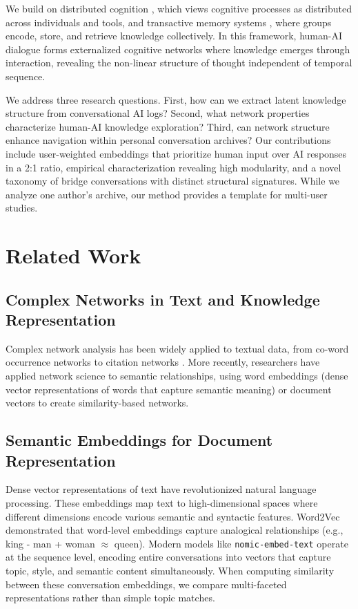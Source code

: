 \documentclass{svproc}
\begin{document}
We build on distributed cognition \cite{hutchins1995}, which views cognitive processes as distributed across individuals and tools, and transactive memory systems \cite{wegner1987}, where groups encode, store, and retrieve knowledge collectively. In this framework, human-AI dialogue forms externalized cognitive networks where knowledge emerges through interaction, revealing the non-linear structure of thought independent of temporal sequence.

We address three research questions. First, how can we extract latent knowledge structure from conversational AI logs? Second, what network properties characterize human-AI knowledge exploration? Third, can network structure enhance navigation within personal conversation archives? Our contributions include user-weighted embeddings that prioritize human input over AI responses in a 2:1 ratio, empirical characterization revealing high modularity, and a novel taxonomy of bridge conversations with distinct structural signatures. While we analyze one author's archive, our method provides a template for multi-user studies.

\section{Related Work}

\subsection{Complex Networks in Text and Knowledge Representation}

Complex network analysis has been widely applied to textual data, from co-word occurrence networks \cite{callon1983} to citation networks \cite{price1965}. More recently, researchers have applied network science to semantic relationships, using word embeddings (dense vector representations of words that capture semantic meaning) \cite{levy2014} or document vectors \cite{mikolov2013} to create similarity-based networks.

\subsection{Semantic Embeddings for Document Representation}

Dense vector representations of text have revolutionized natural language processing. These embeddings map text to high-dimensional spaces where different dimensions encode various semantic and syntactic features. Word2Vec \cite{mikolov2013} demonstrated that word-level embeddings capture analogical relationships (e.g., king - man + woman $\approx$ queen). Modern models like \texttt{nomic-embed-text} operate at the sequence level, encoding entire conversations into vectors that capture topic, style, and semantic content simultaneously. When computing similarity between these conversation embeddings, we compare multi-faceted representations rather than simple topic matches.
\end{document}

